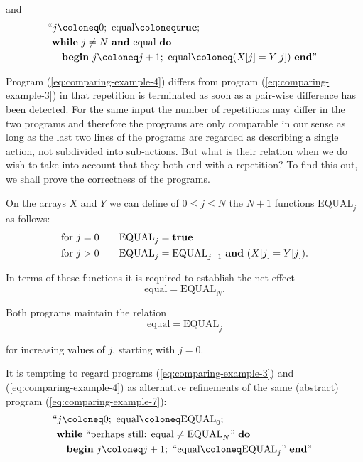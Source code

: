 \documentclass[twoside,11pt]{book}
\begin{document}
\noindent
and
\begin{equation}
	\label{eq:comparing-example-4}
	\begin{split}
		&\text{\hspace{-.4em}``}j \coloneq 0;\text{ equal} \coloneq \text{\textbf{true}};\\
		&\text{\textbf{while} } j \neq N\text{ \textbf{and} equal \textbf{do}}\\
		&\quad\text{\textbf{begin} } j \coloneq  j + 1;\text{ equal} \coloneq (X[j] = Y[j]) \text{ \textbf{end}''}
	\end{split}
\end{equation}

Program (\ref{eq:comparing-example-4}) differs from program (\ref{eq:comparing-example-3}) in that repetition is terminated as soon as a pair-wise difference has been detected. For the same input the number of repetitions may differ in the two programs and therefore the programs are only comparable in our sense as long as the last two lines of the programs are regarded as describing a single action, not subdivided into sub-actions. But what is their relation when we do wish to take into account that they both end with a repetition? To find this out, we shall prove the correctness of the programs.

On the arrays $X$ and $Y$ we can define of $0 \leqslant j \leqslant N$ the $N + 1$ functions $\text{EQUAL}_j$ as follows:
\begin{equation}
	\label{eq:comparing-example-5}
	\begin{split}
		\text{for } j = 0\qquad & \text{EQUAL}_j = \text{\textbf{true}} \\
		\text{for } j > 0\qquad  & \text{EQUAL}_j = \text{EQUAL}_{j-1}\text{ \textbf{and} } (X[j] = Y[j]).
	\end{split}
\end{equation}

In terms of these functions it is required to establish the net effect
$$
\text{equal} = \text{EQUAL}_N.
$$

Both programs maintain the relation
\begin{equation}
	\text{equal} = \text{EQUAL}_j
\end{equation}

\noindent
for increasing values of $j$, starting with $j = 0$.

It is tempting to regard programs (\ref{eq:comparing-example-3}) and (\ref{eq:comparing-example-4}) as alternative refinements of the same (abstract) program (\ref{eq:comparing-example-7}):
\begin{equation}
	\label{eq:comparing-example-7}
	\begin{split}
		&\text{\hspace{-.4em}``}j \coloneq 0;\text{ equal} \coloneq \text{EQUAL}_0;\\
		&\text{\textbf{while} ``perhaps still: equal} \neq \text{EQUAL}_N\text{'' \textbf{do}}\\
		&\quad\text{\textbf{begin} } j \coloneq  j + 1;\text{ ``equal} \coloneq \text{EQUAL}_j\text{'' \textbf{end}''}
	\end{split}
\end{equation}
\end{document}
